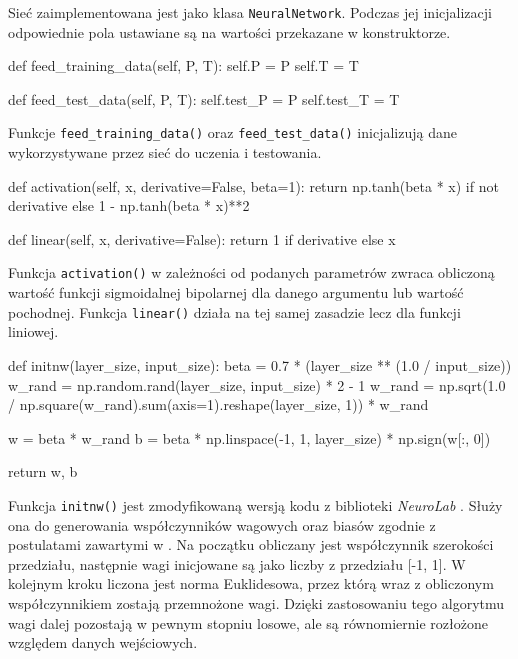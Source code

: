 \documentclass[a4paper,12pt]{article}
\numberwithin{equation}{section}
\begin{document}
\noindent Sieć zaimplementowana jest jako klasa \texttt{NeuralNetwork}. Podczas jej inicjalizacji odpowiednie pola ustawiane są na wartości przekazane w konstruktorze.


\begin{pythoncode}
def feed_training_data(self, P, T):
    self.P = P
    self.T = T

def feed_test_data(self, P, T):
    self.test_P = P
    self.test_T = T
\end{pythoncode}

\noindent Funkcje \texttt{feed_training_data()} oraz \texttt{feed_test_data()} inicjalizują dane wykorzystywane przez sieć do uczenia i testowania.


\begin{pythoncode}
def activation(self, x, derivative=False, beta=1):
    return np.tanh(beta * x) if not derivative else 1 - np.tanh(beta * x)**2

def linear(self, x, derivative=False):
    return 1 if derivative else x
\end{pythoncode}

\noindent Funkcja \texttt{activation()} w zależności od podanych parametrów zwraca obliczoną wartość funkcji sigmoidalnej bipolarnej dla danego argumentu lub wartość pochodnej. Funkcja \texttt{linear()} działa na tej samej zasadzie lecz dla funkcji liniowej.


\label{code:initnw}
\begin{pythoncode}
def initnw(layer_size, input_size):
    beta = 0.7 * (layer_size ** (1.0 / input_size))
    w_rand = np.random.rand(layer_size, input_size) * 2 - 1
    w_rand = np.sqrt(1.0 / np.square(w_rand).sum(axis=1).reshape(layer_size, 1)) * w_rand

    w = beta * w_rand
    b = beta * np.linspace(-1, 1, layer_size) * np.sign(w[:, 0])

    return w, b
\end{pythoncode}

\noindent Funkcja \texttt{initnw()} jest zmodyfikowaną wersją kodu z biblioteki \textit{NeuroLab} \cite{initnw}. Służy ona do generowania współczynników wagowych oraz biasów zgodnie z postulatami zawartymi w \cite{nguyen_widrow}. Na początku obliczany jest współczynnik szerokości przedziału, następnie wagi inicjowane są jako liczby z przedziału [-1, 1]. W kolejnym kroku liczona jest norma Euklidesowa, przez którą wraz z obliczonym współczynnikiem zostają przemnożone wagi. Dzięki zastosowaniu tego algorytmu wagi dalej pozostają w pewnym stopniu losowe, ale są równomiernie rozłożone względem danych wejściowych.
\end{document}
